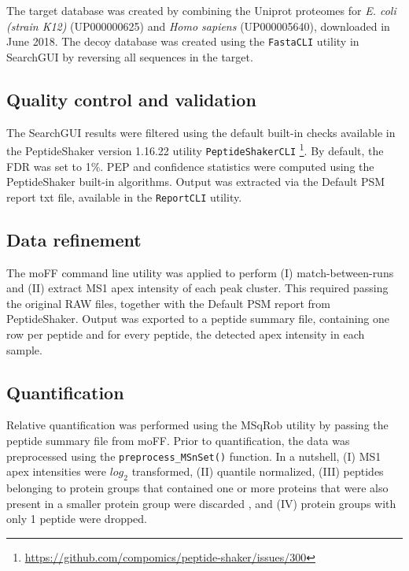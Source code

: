 The target database was created by combining the Uniprot proteomes for \textit{E. coli (strain K12)} (UP000000625) and \textit{Homo sapiens} (UP000005640), downloaded in June 2018. The decoy database was created using the \texttt{FastaCLI} utility in SearchGUI by reversing all sequences in the target.

\subsection{Quality control and validation}

The SearchGUI results were filtered using the default built-in checks available in the PeptideShaker version 1.16.22 utility \texttt{PeptideShakerCLI} \cite{Vaudel2015} \footnote{\href{https://github.com/compomics/peptide-shaker/issues/300}{https://github.com/compomics/peptide-shaker/issues/300}}. By default, the FDR was set to 1\%. PEP and confidence statistics were computed using the PeptideShaker built-in algorithms. Output was extracted via the Default PSM report txt file, available in the \texttt{ReportCLI} utility.


\subsection{Data refinement}

The moFF command line utility \cite{Argentini2016} was applied to perform (I) match-between-runs and (II) extract MS1 apex intensity of each peak cluster. This required passing the original RAW files, together with the Default PSM report from PeptideShaker. Output was exported to a peptide summary file, containing  one row per peptide and for every peptide, the detected apex intensity in each sample.

\subsection{Quantification}

Relative quantification was performed using the MSqRob utility by passing the peptide summary file from moFF. Prior to quantification, the data was preprocessed using the \texttt{preprocess\_MSnSet()} function. In a nutshell, (I) MS1 apex intensities were $log_2$ transformed, (II) quantile normalized, (III) peptides belonging to protein groups that contained one or more proteins that were also present in a smaller protein group were discarded \cite{Goeminne2016}, and (IV) protein groups with only 1 peptide were dropped.

